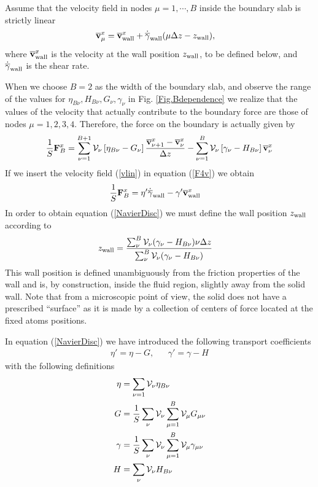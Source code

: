 \documentclass[b5paper,openright,10pt]{book}
\begin{document}
Assume that  the velocity field  in nodes $\mu=1,\cdots,B$  inside the
boundary slab is strictly linear
\begin{align}
\overline{\bf v}^x_{\mu}&=  \overline{\bf v}^x_{\rm wall}+\dot{\overline{\gamma}}_{\rm wall}(\mu\Delta z-z_{\rm wall}),
\label{vlin}
\end{align}
where  $\overline{\bf v}^x_{\rm  wall}$ is  the velocity  at the  wall
position    $z_{\rm    wall}$,    to    be    defined    below,    and
$\dot{\overline{\gamma}}_{\rm wall}$ is the  shear rate.  

When we  choose $B=2$ as the  width of the boundary  slab, and observe
the  range   of  the  values  for   $\eta_{B\nu}, H_{B\nu},G_\nu,\gamma_\nu$  in
Fig. \ref{Fig.Bdependence} we realize that the values of the velocity
that actually contribute to the boundary force are those of nodes $\mu=1,2,3,4$.
Therefore, the force on the boundary is actually given  by
\begin{align}
\frac{1}{S}{\bf F}^x_B=  \sum_{\nu=1}^{B+1} {\cal V}_\nu 
\left[\eta_{B\nu}-G_\nu \right]\frac{\overline{\bf v}^x_{\nu+1}-\overline{\bf v}^x_{\nu}}{\Delta z}
-\sum_{\nu=1}^{B} {\cal V}_\nu\left[\gamma_{\nu}-H_{B\nu}\right]\overline{\bf v}^x_\nu
\label{F4v}
\end{align}
If we insert
the velocity field (\ref{vlin}) in equation (\ref{F4v}) we obtain
\begin{align}
\frac{1}{S}{\bf F}^x_B&=\eta'\dot{\overline{\gamma}}_{\rm wall}
-\gamma'\overline{\bf v}^x_{\rm wall}
\label{NavierDisc}
\end{align}
In order  to obtain equation   (\ref{NavierDisc}) we must define  the wall
position $z_{\rm wall}$ according to
\begin{align}
  z_{\rm wall}&=\frac{\sum_\nu^{B}{\cal V}_\nu(\gamma_\nu-H_{B \nu})\nu\Delta z}
{\sum_\nu^{B}{\cal V}_\nu(\gamma_\nu-H_{B \nu}) }
\label{zwallDisc}
\end{align}
This  wall   position  is  defined  unambiguously   from  the  friction
properties  of the  wall and  is,  by construction,  inside the  fluid
region,  slightly  away  from  the   solid  wall.  Note  that  from  a
microscopic  point of  view,  the  solid does  not  have a  prescribed
``surface'' as it is made by  a collection of centers of force located
at the fixed atoms positions.


In equation (\ref{NavierDisc}) we have introduced the following transport coefficients
\begin{align}
  \eta'=   \eta - G, &&
\gamma'=  \gamma-H
\end{align}
with the following definitions \begin{align}
\eta&= \sum_{\nu=1} {\cal V}_\nu \eta_{B\nu}
\nonumber\\
G &=  \frac{1}{S} \sum_{\nu} {\cal V}_\nu \sum^{B}_{\mu=1}{\cal V}_\mu G_{\mu\nu}
\nonumber\\
\gamma&=  \frac{1}{S}\sum_{\nu}{\cal V}_\nu\sum^{B}_{\mu=1}{\cal V}_\mu \gamma_{\mu\nu}
\nonumber\\
H&= \sum_{\nu} {\cal V}_\nu H_{B\nu}
\label{etagamma2}
\end{align}
\end{document}
